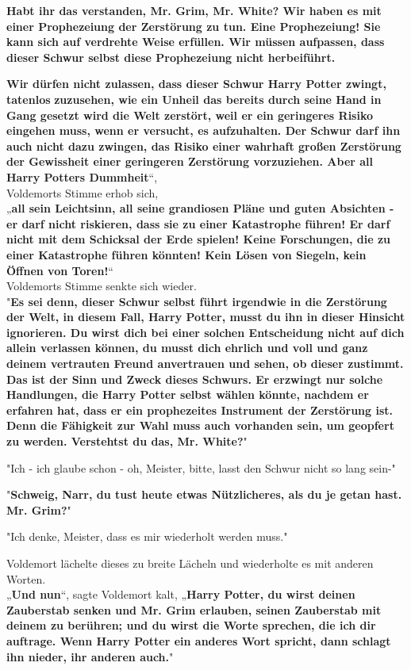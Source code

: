 {\textbf{Habt ihr das verstanden, Mr. Grim, Mr. White? Wir haben es mit einer Prophezeiung der Zerstörung zu tun. Eine Prophezeiung! Sie kann sich auf verdrehte Weise erfüllen. Wir müssen aufpassen, dass dieser Schwur selbst diese Prophezeiung nicht herbeiführt.}

\textbf{Wir dürfen nicht zulassen, dass dieser Schwur Harry Potter zwingt, tatenlos} \textbf{zuzusehen, wie ein Unheil das bereits durch seine Hand in Gang gesetzt wird die Welt zerstört, weil er ein geringeres Risiko eingehen muss, wenn er versucht, es aufzuhalten. Der Schwur darf ihn auch nicht dazu zwingen, das Risiko einer wahrhaft großen Zerstörung der Gewissheit einer geringeren Zerstörung vorzuziehen. Aber all Harry Potters Dummheit}“,\\ Voldemorts Stimme erhob sich,\\ „\textbf{all sein Leichtsinn, all seine grandiosen Pläne und guten Absichten - er darf nicht riskieren, dass sie zu einer Katastrophe führen! Er darf nicht mit dem Schicksal der Erde spielen! Keine Forschungen, die zu einer Katastrophe führen könnten! Kein Lösen von Siegeln, kein Öffnen von Toren!}“\\ Voldemorts Stimme senkte sich wieder.\\ "\textbf{Es sei denn, dieser Schwur selbst führt irgendwie in die Zerstörung der Welt, in diesem Fall, Harry Potter, musst du ihn in dieser Hinsicht ignorieren. Du wirst dich bei einer solchen Entscheidung nicht auf dich allein verlassen können, du musst dich ehrlich und voll und ganz deinem vertrauten Freund anvertrauen und sehen, ob dieser zustimmt.}\\ \textbf{\hfill\break Das ist der Sinn und Zweck dieses Schwurs. Er erzwingt nur solche Handlungen, die Harry Potter selbst wählen könnte, nachdem er erfahren hat, dass er ein prophezeites Instrument der Zerstörung ist. Denn die Fähigkeit zur Wahl muss auch vorhanden sein, um geopfert zu werden. Verstehtst du das, Mr. White?}"

"Ich - ich glaube schon - oh, Meister, bitte, lasst den Schwur nicht so lang sein-"

"\textbf{Schweig, Narr, du tust heute etwas Nützlicheres, als du je getan hast. Mr. Grim?}"

"Ich denke, Meister, dass es mir wiederholt werden muss."

Voldemort lächelte dieses zu breite Lächeln und wiederholte es mit anderen Worten.\\ „\textbf{Und nun}“, sagte Voldemort kalt, „\textbf{Harry Potter, du wirst deinen Zauberstab senken und Mr. Grim erlauben, seinen Zauberstab mit deinem zu berühren; und du wirst die Worte sprechen, die ich dir auftrage. Wenn Harry Potter ein anderes Wort spricht, dann schlagt ihn nieder, ihr anderen auch.}"

}
